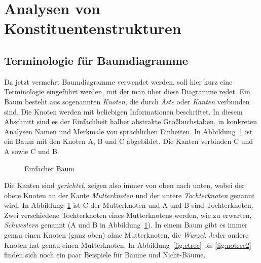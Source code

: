 

\section{Analysen von Konstituentenstrukturen}

\label{sec:topokons}

\subsection{Terminologie für Baumdiagramme}

\label{sec:baumterminologie}


Da jetzt vermehrt Baumdiagramme verwendet werden, soll hier kurz eine Terminologie eingeführt werden, mit der man über diese Diagramme redet.
Ein Baum besteht aus sogenannten \textit{Knoten}, die durch \textit{Äste} oder \textit{Kanten} verbunden sind.
Die Knoten werden mit beliebigen Informationen beschriftet.
In diesem Abschnitt sind es der Einfachheit halber abstrakte Großbuchstaben, in konkreten Analysen Namen und Merkmale von sprachlichen Einheiten.
In Abbildung~\ref{fig:baumschema} ist ein Baum mit den Knoten A, B und C abgebildet.
Die Kanten verbinden C und A sowie C und B.


\begin{figure}[!htbp]
  \centering
  \caption{Einfacher Baum}
  \label{fig:baumschema}
\end{figure}


Die Kanten sind \textit{gerichtet}, zeigen also immer von oben nach unten, wobei der obere Knoten an der Kante \textit{Mutterknoten} und der untere \textit{Tochterknoten} genannt wird.
In Abbildung~\ref{fig:baumschema} ist C der Mutterknoten und A und B sind Tochterknoten.
Zwei verschiedene Tochterknoten eines Mutterknotens werden, wie zu erwarten, \textit{Schwestern} genannt (\zB A und B in Abbildung~\ref{fig:baumschema}).
In einem Baum gibt es immer genau einen Knoten (ganz oben) ohne Mutterknoten, die \textit{Wurzel}.
Jeder andere Knoten hat genau einen Mutterknoten.
In Abbildung~\ref{fig:ctree} bis \ref{fig:notree2} finden sich noch ein paar Beispiele für Bäume und Nicht-Bäume.

